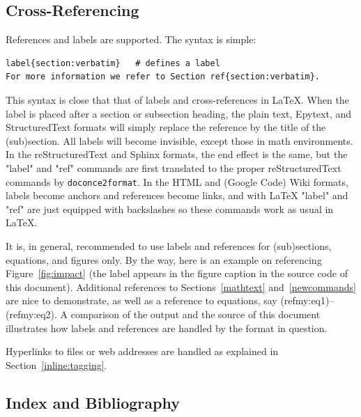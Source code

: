 \documentclass{article}
\begin{document}
\subsection{Cross-Referencing}

  

References and labels are supported. The syntax is simple:
\begin{Verbatim}[fontsize=\fontsize{9pt}{9pt},tabsize=8,baselinestretch=0.85,
fontfamily=tt,xleftmargin=7mm]
label{section:verbatim}   # defines a label
For more information we refer to Section ref{section:verbatim}.
\end{Verbatim}
\noindent
This syntax is close that that of labels and cross-references in
{\LaTeX}. When the label is placed after a section or subsection heading,
the plain text, Epytext, and StructuredText formats will simply
replace the reference by the title of the (sub)section.  All labels
will become invisible, except those in math environments.  In the
reStructuredText and Sphinx formats, the end effect is the same, but
the "label" and "ref" commands are first translated to the proper
reStructuredText commands by {\fontsize{10pt}{10pt}\verb!doconce2format!}. In the HTML and (Google
Code) Wiki formats, labels become anchors and references become links,
and with {\LaTeX} "label" and "ref" are just equipped with backslashes so
these commands work as usual in {\LaTeX}.

It is, in general, recommended to use labels and references for
(sub)sections, equations, and figures only.
By the way, here is an example on referencing Figure~\ref{fig:impact}
(the label appears in the figure caption in the source code of this document).
Additional references to Sections~\ref{mathtext} and~\ref{newcommands} are
nice to demonstrate, as well as a reference to equations,
say (ref{my:eq1})--(ref{my:eq2}). A comparison of the output and
the source of this document illustrates how labels and references
are handled by the format in question.

Hyperlinks to files or web addresses are handled as explained
in Section~\ref{inline:tagging}.

\subsection{Index and Bibliography}

  
\end{document}
